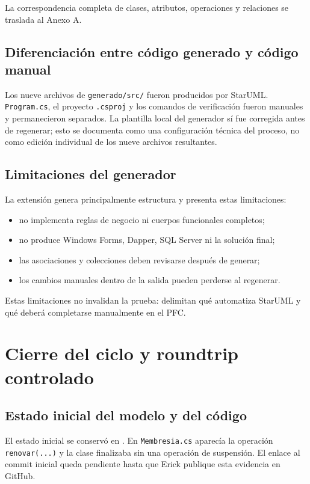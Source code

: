 \documentclass[12pt,a4paper]{article}
\begin{document}
La correspondencia completa de clases, atributos, operaciones y relaciones se
traslada al Anexo A.

\subsection{Diferenciación entre código generado y código manual}

Los nueve archivos de \texttt{generado/src/} fueron producidos por StarUML.
\texttt{Program.cs}, el proyecto \texttt{.csproj} y los comandos de
verificación fueron manuales y permanecieron separados. La plantilla local
del generador sí fue corregida antes de regenerar; esto se documenta como una
configuración técnica del proceso, no como edición individual de los nueve
archivos resultantes.

\subsection{Limitaciones del generador}

La extensión genera principalmente estructura y presenta estas limitaciones:
\begin{itemize}[nosep]
  \item no implementa reglas de negocio ni cuerpos funcionales completos;
  \item no produce Windows Forms, Dapper, SQL Server ni la solución final;
  \item las asociaciones y colecciones deben revisarse después de generar;
  \item los cambios manuales dentro de la salida pueden perderse al regenerar.
\end{itemize}

Estas limitaciones no invalidan la prueba: delimitan qué automatiza StarUML y
qué deberá completarse manualmente en el PFC.


\section{Cierre del ciclo y roundtrip controlado}

\subsection{Estado inicial del modelo y del código}

El estado inicial se conservó en . En
\texttt{Membresia.cs} aparecía la operación \texttt{renovar(...)} y la clase
finalizaba sin una operación de suspensión. El enlace al commit inicial queda
pendiente hasta que Erick publique esta evidencia en GitHub.
\end{document}
